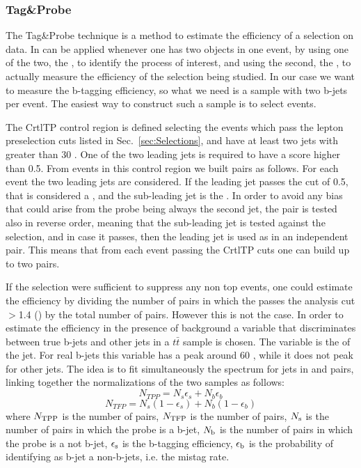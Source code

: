 \subsubsection{Tag\&Probe \label{sec:TagAndProbe}}
The Tag\&Probe technique is a method to estimate the efficiency of a selection on data. In can be applied whenever one has two objects in one event, by using one of the two, the \tg{}, to identify the process of interest, and using the second, the \probe{}, to actually measure the efficiency of the selection being studied. In our case we want to measure the b-tagging efficiency, so what we need is a sample with two b-jets per event. The easiest way to construct such a sample is to select \ttbar events.

The CrtlTP control region is defined selecting the events which pass the lepton preselection cuts listed in Sec.~\ref{sec:Selections}, and have at least two jets with \pt greater than 30 \GeV.
One of the two leading jets is required to have a \jpb score higher than 0.5. From events in this control region we built \tp{} pairs as follows. For each event the two leading jets are considered. If the leading jet passes the \jpb cut of 0.5, that is considered a \tg{}, and the sub-leading jet is the \probe{}. In order to avoid any bias that could arise from the probe being always the second jet, the pair is tested also in reverse order, meaning that the sub-leading jet is tested against the \tg{} selection, and in case it passes, then the leading jet is used as \probe{} in an independent \tp{} pair. This means that from each event passing the CrtlTP cuts one can build up to two \tp{} pairs. 

If the \tg{} selection were sufficient to suppress any non top events, one could estimate the efficiency by dividing the number of \tp{} pairs in which the \probe{} passes the analysis cut \jpb$>$1.4 (\tpp) by the total number of \tp{} pairs. However this is not the case. 
In order to estimate the efficiency in the presence of background a variable that discriminates between true b-jets and other jets in a $t\bar{t}$ sample is chosen. The variable is the \pt of the \probe{} jet. For real b-jets this variable has a peak around 60 \GeV, while it does not peak for other jets. The idea is to fit simultaneously the \pt spectrum for \probe{} jets in \tpp{} and \tfp{} pairs, linking together the normalizations of the two samples as follows:
\begin{equation}
N_{TPP}=N_{s}\epsilon_{s} + N_b\epsilon_{b}
\end{equation}
\begin{equation}
N_{TFP}=N_{s}(1-\epsilon_{s}) + N_b(1-\epsilon_{b})
\end{equation}
where $N_{\rm TPP}$ is the number of \tpp{} pairs, $N_{\rm TFP}$ is the number of \tfp{} pairs, $N_{\rm s}$ is the number of \tp{} pairs in which the probe is a b-jet, $N_{\rm b}$ is the number of \tp{} pairs in which the probe is a not b-jet, $\epsilon_{\rm s}$ is the b-tagging efficiency, $\epsilon_{\rm b}$ is the probability of identifying as b-jet a non-b-jets, i.e. the mistag rate. 

